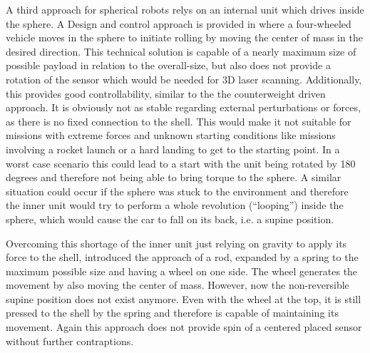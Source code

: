 A third approach for spherical robots relys on an internal unit which drives inside the sphere. A Design and control approach is provided in \cite{soa6} where a four-wheeled vehicle moves in the sphere to initiate rolling by moving the center of mass in the desired direction. This technical solution is capable of a nearly maximum size of possible payload in relation to the overall-size, but also does not provide a rotation of the sensor which would be needed for 3D laser scanning. Additionally, this provides good controllability, similar to the the counterweight driven approach. It is obviously not as stable regarding external perturbations or forces, as there is no fixed connection to the shell. This would make it not suitable for missions with extreme forces and unknown starting conditions like missions involving a rocket launch or a hard landing to get to the starting point. In a worst case scenario this could lead to a start with the unit being rotated by 180 degrees and therefore not being able to bring torque to the sphere. A similar situation could occur if the sphere was stuck to the environment and therefore the inner unit would try to perform a whole revolution (``looping'') inside the sphere, which would cause the car to fall on its back, i.e. a supine position.

Overcoming this shortage of the inner unit just relying on gravity to apply its force to the shell, \cite{soa7} introduced the approach of a rod, expanded by a spring to the maximum possible size and having a wheel on one side. The wheel generates the movement by also moving the center of mass. However, now the non-reversible supine position does not exist anymore. Even with the wheel at the top, it is still pressed to the shell by the spring and therefore is capable of maintaining its movement. Again this approach does not provide spin of a centered  placed sensor without further contraptions.
